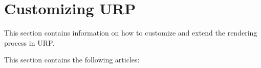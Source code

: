 \chapter{Customizing URP}
\hypertarget{md__hey_tea_9_2_library_2_package_cache_2com_8unity_8render-pipelines_8universal_0d14_80_88_2_documentation_0i_2customizing-urp}{}\label{md__hey_tea_9_2_library_2_package_cache_2com_8unity_8render-pipelines_8universal_0d14_80_88_2_documentation_0i_2customizing-urp}
\label{md__hey_tea_9_2_library_2_package_cache_2com_8unity_8render-pipelines_8universal_0d14_80_88_2_documentation_0i_2customizing-urp_autotoc_md2107}%
%
 This section contains information on how to customize and extend the rendering process in URP.

This section contains the following articles\+:


\begin{DoxyItemize}
\item {} 
\end{DoxyItemize}